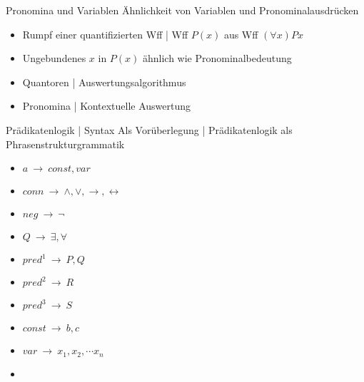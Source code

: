 \begin{frame}
  {Pronomina und Variablen}
  \onslide<+->
  \onslide<+->
  Ähnlichkeit von Variablen und Pronominalausdrücken\\
  \Halbzeile
  \begin{itemize}[<+->]
    \item Rumpf einer quantifizierten Wff | Wff $P(x)$ aus Wff $(\forall x)Px$
    \item Ungebundenes $x$ in $P(x)$ \alert{ähnlich wie Pronominalbedeutung}\\
    \Halbzeile
  \item Quantoren | Auswertungsalgorithmus\\
  \item Pronomina | Kontextuelle Auswertung\\
  \end{itemize}
\end{frame}

\begin{frame}
  {Prädikatenlogik | Syntax}
  \onslide<+->
  \onslide<+->
  Als Vorüberlegung | Prädikatenlogik als \alert{Phrasenstrukturgrammatik}\\
  \Halbzeile
  \begin{itemize}[<+->]
    \item[ ] $a\ \rightarrow\ const, var$ 
    \item[ ] $conn\ \rightarrow\ \wedge,\vee,\rightarrow,\leftrightarrow$ 
    \item[ ] $neg\ \rightarrow\ \neg$ 
    \item[ ] $Q\ \rightarrow\ \exists,\forall$ 
    \item[ ] $pred^1\ \rightarrow\ P, Q$ 
    \item[ ] $pred^2\ \rightarrow\ R$ 
    \item[ ] $pred^3\ \rightarrow\ S$ 
    \item[ ] $const\ \rightarrow\ b, c$ 
    \item[ ] $var\ \rightarrow\ x_1,x_2,\cdots x_n$ 
      \Halbzeile
    \item {}
  \end{itemize}
\end{frame}

